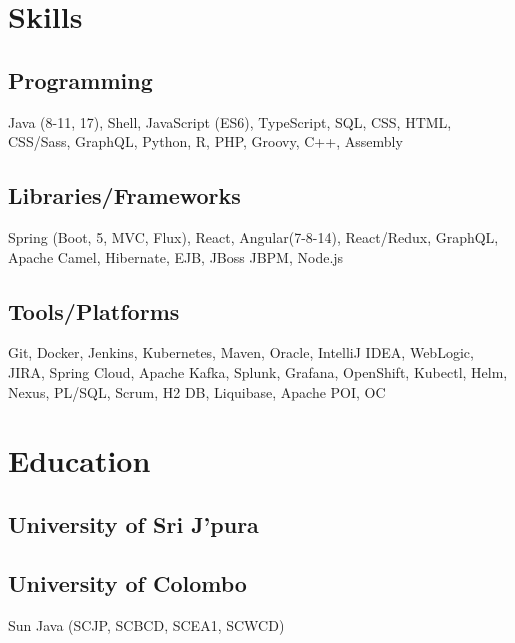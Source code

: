 \documentclass[]{plushcv}
\begin{document}
\begin{minipage}[t]{0.25\textwidth} 


\section{Skills}
\subsection{Programming}
\sectionsep
{}
Java (8-11, 17), Shell, JavaScript (ES6), TypeScript, SQL, CSS, HTML, CSS/Sass, GraphQL, Python, R, PHP, Groovy,  C++, Assembly 
\\
\sectionsep
\sectionsep
\subsection{Libraries/Frameworks}
\sectionsep
Spring (Boot, 5, MVC, Flux), React, Angular(7-8-14), React/Redux, GraphQL, Apache Camel, Hibernate, EJB, JBoss JBPM, Node.js
\\
\sectionsep
\subsection{Tools/Platforms}
Git, Docker, Jenkins, Kubernetes, Maven, Oracle, IntelliJ IDEA, WebLogic, JIRA, Spring Cloud, Apache Kafka, Splunk, Grafana, OpenShift, Kubectl, Helm, Nexus, PL/SQL, Scrum, H2 DB, Liquibase, Apache POI, OC
\\
\sectionsep


\section{Education} 
\subsection{University of Sri J'pura}
\sectionsep
\subsection{University of Colombo}
Sun Java (SCJP, SCBCD, SCEA1, SCWCD) \\
\sectionsep


\end{minipage}
\end{document}
